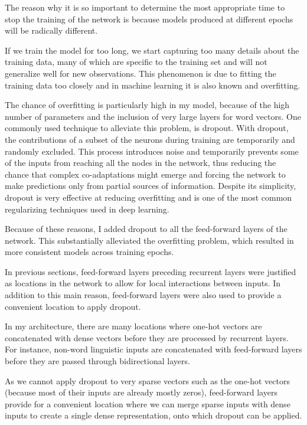 The reason why it is so important to determine the most appropriate time to stop the training of the network is because models produced at different epochs will be radically different.

If we train the model for too long, we start capturing too many details about the training data, many of which are specific to the training set and will not generalize well for new observations.
This phenomenon is due to fitting the training data too closely and in machine learning it is also known and overfitting.

The chance of overfitting is particularly high in my model, because of the high number of parameters and the inclusion of very large layers for word vectors.
One commonly used technique to alleviate this problem, is dropout.
With dropout, the contributions of a subset of the neurons during training \citep{Srivastava2014Dropout} are temporarily and randomly excluded.
This process introduces noise and temporarily prevents some of the inputs from reaching all the nodes in the network, thus reducing the chance that complex co-adaptations might emerge and forcing the network to make predictions only from partial sources of information.
Despite its simplicity, dropout is very effective at reducing overfitting and is one of the most common regularizing techniques used in deep learning.

Because of these reasons, I added dropout to all the feed-forward layers of the network.
This substantially alleviated the overfitting problem, which resulted in more consistent models across training epochs.

In previous sections, feed-forward layers preceding recurrent layers were justified as locations in the network to allow for local interactions between inputs.
In addition to this main reason, feed-forward layers were also used to provide a convenient location to apply dropout.

In my architecture, there are many locations where one-hot vectors are concatenated with dense vectors before they are processed by recurrent layers.
For instance, non-word linguistic inputs are concatenated with feed-forward layers before they are passed through bidirectional layers.

As we cannot apply dropout to very sparse vectors such as the one-hot vectors (because most of their inputs are already mostly zeros), feed-forward layers provide for a convenient location where we can merge sparse inputs with dense inputs to create a single dense representation, onto which dropout can be applied.

